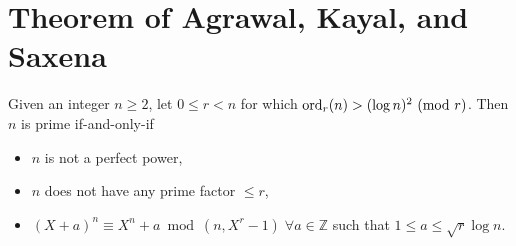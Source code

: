 \documentclass[../main.tex]{subfiles}
\begin{document}
\section{Theorem of Agrawal, Kayal, and Saxena}

\begin{theorem} \label{aks}

Given an integer $n \geq 2$, let $0 \leq r < n$ for which $\mbox{ord}_{r}(n) > (\log{n})^{2} \ (\mathrm{mod}\ r)$. Then $n$ is prime if-and-only-if
\begin{itemize}
 \item $n$ is not a perfect power,
 \item $n$ does not have any prime factor $\leq r$,
 \item $(X + a)^{n} \equiv X^{n} + a \bmod (n, X^{r} - 1)\; \forall a \in \mathbb{Z}$ such that $1 \leq a \leq \sqrt{r} \log{n}$.
\end{itemize}
\end{theorem}
\end{document}
